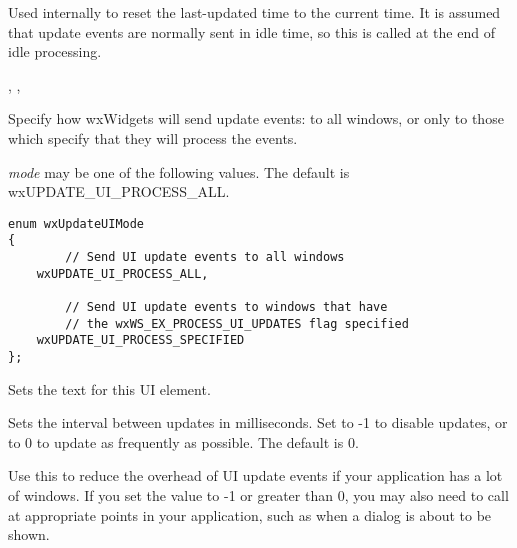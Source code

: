 \label{wxupdateuieventresetupdatetime}


Used internally to reset the last-updated time to the
current time. It is assumed that update events are
normally sent in idle time, so this is called at the end of
idle processing.


, 
, 

\label{wxupdateuieventsetmode}


Specify how wxWidgets will send update events: to
all windows, or only to those which specify that they
will process the events.

{\it mode} may be one of the following values.
The default is wxUPDATE\_UI\_PROCESS\_ALL.

\begin{verbatim}
enum wxUpdateUIMode
{
        // Send UI update events to all windows
    wxUPDATE_UI_PROCESS_ALL,

        // Send UI update events to windows that have
        // the wxWS_EX_PROCESS_UI_UPDATES flag specified
    wxUPDATE_UI_PROCESS_SPECIFIED
};
\end{verbatim}

\label{wxupdateuieventsettext}


Sets the text for this UI element.

\label{wxupdateuieventsetupdateinterval}


Sets the interval between updates in milliseconds.
Set to -1 to disable updates, or to 0 to update as frequently as possible.
The default is 0.

Use this to reduce the overhead of UI update events if your application
has a lot of windows. If you set the value to -1 or greater than 0,
you may also need to call  
at appropriate points in your application, such as when a dialog
is about to be shown.

